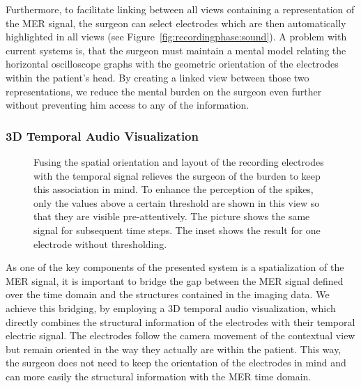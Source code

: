 \documentclass{vgtc}                          %
\begin{document}
Furthermore, to facilitate linking between all views containing a representation of the MER signal, the surgeon can select electrodes which are then automatically highlighted in all views (see Figure~\ref{fig:recordingphase:sound}). A problem with current systems is, that the surgeon must maintain a mental model relating the horizontal oscilloscope graphs with the geometric orientation of the electrodes within the patient's head. By creating a linked view between those two representations, we reduce the mental burden on the surgeon even further without preventing him access to any of the information.


\subsubsection{3D Temporal Audio Visualization}\label{sec:overview:recording:3daudio}
\begin{figure}[t]
    \centering
    \caption{Fusing the spatial orientation and layout of the recording electrodes with the temporal signal relieves the surgeon of the burden to keep this association in mind. To enhance the perception of the spikes, only the values above a certain threshold are shown in this view so that they are visible pre-attentively. The picture shows the same signal for subsequent time steps. The inset shows the result for one electrode without thresholding.}
    \label{fig:recordingphase:3dsound}
\end{figure}

As one of the key components of the presented system is a spatialization of the MER signal, it is important to bridge the gap between the MER signal defined over the time domain and the structures contained in the imaging data. We achieve this bridging, by employing a 3D temporal audio visualization, which directly combines the structural information of the electrodes with their temporal electric signal. The electrodes follow the camera movement of the contextual view but remain oriented in the way they actually are within the patient. This way, the surgeon does not need to keep the orientation of the electrodes in mind and can more easily the structural information with the MER time domain.
\end{document}
